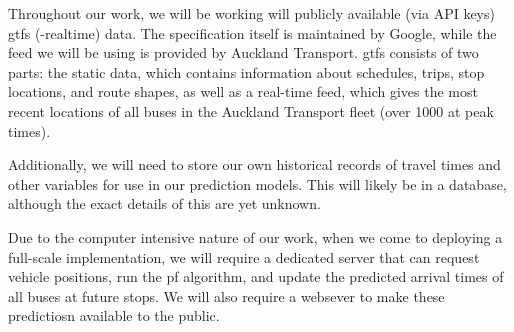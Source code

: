 \documentclass[12pt,a4paper]{article}
\begin{document}

















Throughout our work, we will be working will publicly available (via API keys) \gls{gtfs}
(-realtime) data.
The specification itself is maintained by Google, 
while the feed we will be using is provided by Auckland Transport.
\gls{gtfs} consists of two parts:
the static data, which contains information about schedules, trips, stop locations,
and route shapes, as well as a real-time feed, which gives the most recent locations
of all buses in the Auckland Transport fleet (over 1000 at peak times).


Additionally, we will need to store our own historical records of travel times and other
variables for use in our prediction models. 
This will likely be in a database, although the exact details of this are yet unknown.


Due to the computer intensive nature of our work, 
when we come to deploying a full-scale implementation,
we will require a dedicated server that can request vehicle positions,
run the \gls{pf} algorithm,
and update the predicted arrival times of all buses at future stops.
We will also require a websever to make these predictiosn available to the public.
\end{document}
